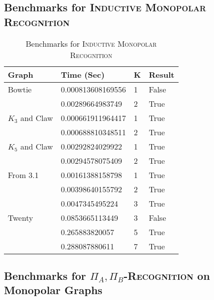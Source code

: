 \documentclass[11pt]{article}
\begin{document}
\subsection{Benchmarks for \textsc{Inductive Monopolar Recognition}}
\label{subsec:irresults} %

\begin{table}[ht]
\begin{center}
\begin{tabu} to 0.9\textwidth { | X[l] X[l] X[c] X[c] | }
\hline
Graph & Time (Sec) & K & Result \\
[0.5ex]
\hline
\hline
Bowtie & 0.000813608169556 & 1 & False \\
[0.3ex]
  & 0.00289664983749 & 2 & True \\
[0.3ex]
\hline
$K_3$ and Claw & 0.000661911964417 & 1 & True \\
[0.3ex]
 & 0.000688810348511 & 2 & True \\
[0.3ex]
\hline
$K_5$ and Claw & 0.00292824029922 & 1 & True \\
[0.3ex]
 & 0.00294578075409 & 2 & True \\
[0.3ex]
\hline
From 3.1 & 0.00161388158798 & 1 & True \\
[0.3ex]
 & 0.00398640155792 & 2 & True \\
[0.3ex]
 & 0.0047345495224 & 3 & True \\
[0.3ex]
\hline
Twenty & 0.0853665113449 & 3 & False \\
[0.3ex]
  & 0.265883820057 & 5 & True \\
[0.3ex]
 & 0.288087880611 & 7 & True \\
[0.3ex]
\hline
\end{tabu}
\caption{Benchmarks for \textsc{Inductive Monopolar Recognition}}
\label{table:irresults}
\end{center}
\end{table}

\subsection{Benchmarks for \textsc{$\Pi_A,\Pi_B$-Recognition} on Monopolar Graphs}\label{subsec:mpresults}
\end{document}
